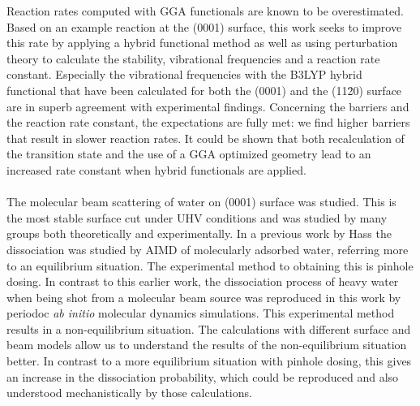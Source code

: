 \documentclass[11pt,DIV=13,BCOR=5mm,a4paper,headinclude]{scrbook}
\begin{document}
Reaction rates computed with GGA functionals are known to be overestimated.
Based on an example reaction at the (0001) surface, this work seeks to improve this rate by applying a hybrid functional method as well as using perturbation theory to calculate the stability, vibrational frequencies and a reaction rate constant.
Especially the vibrational frequencies with the B3LYP hybrid functional that have been calculated for both the (0001) and the (11\=20) surface are in superb agreement with experimental findings.
Concerning the barriers and the reaction rate constant, the expectations are fully met: we find higher barriers that result in slower reaction rates.
It could be shown that both recalculation of the transition state and the use of a GGA optimized geometry lead to an increased rate constant when hybrid functionals are applied.
\\\\

The molecular beam scattering of water on (0001) surface was studied.
This is the most stable surface cut under UHV conditions and was studied by many groups both theoretically and experimentally.
In a previous work by Hass the dissociation was studied by AIMD of molecularly adsorbed water, referring more to an equilibrium situation.
The experimental method to obtaining this is pinhole dosing.
In contrast to this earlier work, the dissociation process of heavy water when being shot from a molecular beam source was reproduced in this work by periodoc \textit{ab initio} molecular dynamics simulations.
This experimental method results in a non-equilibrium situation.
The calculations with different surface and beam models allow us to understand the results of the non-equilibrium situation better.
In contrast to a more equilibrium situation with pinhole dosing, this gives an increase in the dissociation probability, which could be reproduced and also understood mechanistically by those calculations.


\end{document}
